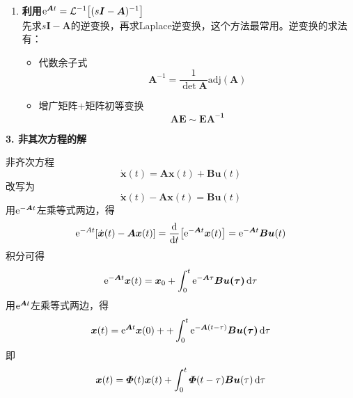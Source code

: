 \begin{enumerate}[\hspace*{1em} (1) ]
	\item \textbf{利用${\rm{e}}^{\bm{A}t} = \mathcal{L}^{-1}\big[(s\bm{I} - \bm{A})^{-1}\big]$}\\
	\hspace*{1em} 先求$s\bm{I} - \bm{A}$的逆变换，再求Laplace逆变换，这个方法最常用。逆变换的求法有：
	\begin{itemize}
		\item 代数余子式
		\begin{equation}
			\bm{A}^{-1} = \dfrac{1}{\det \bm{A}}\text{adj}(\bm{A})
		\end{equation}
		\item 增广矩阵$+$矩阵初等变换
		\begin{equation}
			\bm{AE} \sim \bm{EA^{-1}}
		\end{equation}
	\end{itemize}
\end{enumerate}
\vspace*{0.5em}

\noindent \textbf{3. 非其次方程的解}

非齐次方程
\begin{equation}
	\bm{\dot{x}}(t) = \bm{Ax}(t) + \bm{Bu}(t)
\end{equation}
改写为
\begin{equation}
	\bm{\dot{x}}(t) - \bm{Ax}(t) = \bm{Bu}(t)
\end{equation}
用${\rm{e}}^{-\bm{A}t}$左乘等式两边，得
\begin{equation}
	{\rm{e}}^{-At}[\dot{\bm{x}}(t) - \bm{Ax}(t)] = \dfrac{{\rm{d}} }{{\rm{d}} t}\big[{\rm{e}}^{-\bm{A}t} \bm{x}(t)\big] = {\rm{e}}^{-\bm{A}t}\bm{Bu}(t)
\end{equation}
积分可得
\begin{equation}
	{\rm{e}}^{-\bm{A}t}\bm{x}(t) = \bm{x}_0 + \int_0^t {\rm{e}}^{-\bm{A}\tau}\bm{Bu(\tau)}\, {\rm{d}} \tau
\end{equation}
用${\rm{e}}^{\bm{A}t}$左乘等式两边，得
\begin{equation}
	\bm{x}(t) = {\rm{e}}^{\bm{A}t}\bm{x}(0) + + \int_0^t {\rm{e}}^{-\bm{A}(t - \tau)}\bm{Bu(\tau)}\, {\rm{d}} \tau
\end{equation}
即
\begin{equation}
	\bm{x}(t) = \bm{\varPhi}(t)\bm{x}(t) + \int_0^t \bm{\varPhi}(t - \tau)\bm{Bu}(\tau)\, {\rm{d}} \tau
\end{equation}

